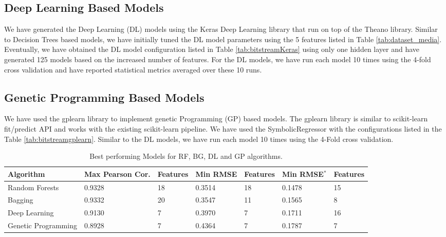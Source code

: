 \documentclass[journal]{IEEEtran}
\begin{document}
\vspace{-0.2cm}
\subsection{Deep Learning Based Models}

We have generated the Deep Learning (DL) models using the Keras Deep Learning library that run on top of the Theano library. Similar to Decision Trees based models, we have initially tuned the DL model parameters using the 5 features listed in Table \ref{tab:dataset_media}. Eventually, we have obtained the DL model configuration listed in Table \ref{tab:bitstreamKeras} using only one hidden layer and have generated 125 models based on the increased number of features. For the DL models, we have run each model 10 times using the 4-fold cross validation and have reported statistical metrics averaged over these 10 runs.

\vspace{-0.2cm}
\subsection{Genetic Programming Based Models}

We have used the gplearn library to implement genetic Programming (GP) based models. The gplearn library is similar to scikit-learn fit/predict API and works with the existing scikit-learn pipeline. We have used the SymbolicRegressor with the configurations listed in the Table \ref{tab:bitstreamgplearn}. Similar to the DL models, we have run each model 10 times using the 4-Fold cross validation. 

\begin{table}
\centering
\caption{Best performing Models for RF, BG, DL and GP algorithms.}
\label{tab:maxminvalues}
\begin{tabular}{|l||l|l||l|l||l|l|} \hline
Algorithm & Max Pearson Cor. & Features & Min RMSE & Features & Min RMSE$^*$ & Features \\ \hline
Random Forests & 0.9328 & 18 & 0.3514 & 18 & 0.1478 & 15 \\ \hline
Bagging & 0.9332 & 20 & 0.3547 & 11 & 0.1565 & 8 \\ \hline
Deep Learning & 0.9130 & 7 & 0.3970 & 7 & 0.1711 & 16 \\ \hline
Genetic Programming & 0.8928 & 7 & 0.4364 & 7 & 0.1787 & 7 \\ \hline
\end{tabular}
\vspace{-0.2cm}
\end{table}
\end{document}
